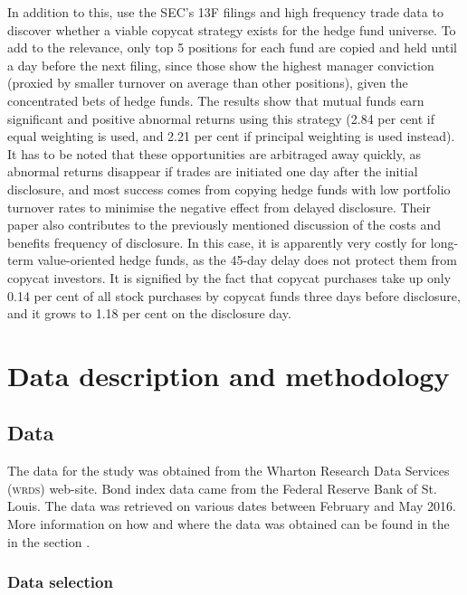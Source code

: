 \documentclass[12pt, a4]{article}
\begin{document}
In addition to this, \cite{kim} use the \textsc{SEC}'s 13F filings and high frequency trade data to discover whether a viable copycat strategy exists for the hedge fund universe. To add to the relevance, only top 5 positions for each fund are copied and held until a day before the next filing, since those show the highest manager conviction (proxied by smaller turnover on average than other positions), given the concentrated bets of hedge funds. The results show that mutual funds earn significant and positive abnormal returns using this strategy (2.84 per cent if equal weighting is used, and 2.21 per cent if principal weighting is used instead). It has to be noted that these opportunities are arbitraged away quickly, as abnormal returns disappear if trades are initiated one day after the initial disclosure, and most success comes from copying hedge funds with low portfolio turnover rates to minimise the negative effect from delayed disclosure.  Their paper also contributes to the previously mentioned discussion of the costs and benefits frequency of disclosure. In this case, it is apparently very costly for long-term value-oriented hedge funds, as the 45-day delay does not protect them from copycat investors. It is signified by the fact that copycat purchases take up only 0.14 per cent of all stock purchases by copycat funds three days before disclosure, and it grows to 1.18 per cent on the disclosure day.


\clearpage
\section{Data description and methodology}\label{sec:methodology}

\subsection{Data}

The data for the study was obtained from the Wharton Research Data Services (\textsc{wrds}) web-site. Bond index data came from the Federal Reserve Bank of St. Louis. The data was retrieved on various dates between February and May 2016. More information on how and where the data was obtained can be found in the  in the section .

\subsubsection{Data selection}
\end{document}

